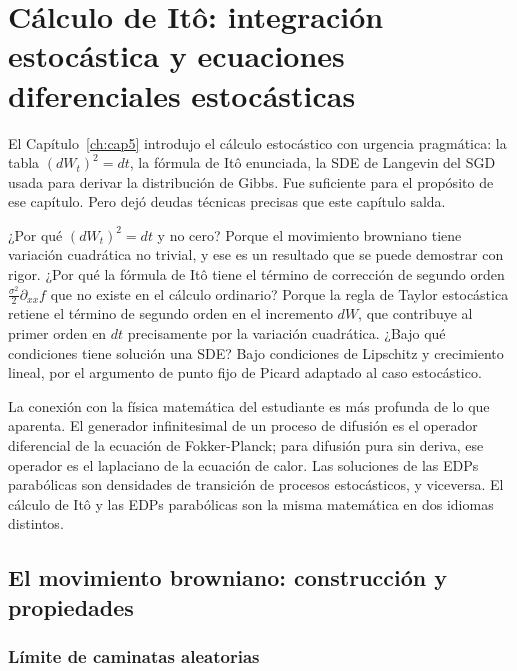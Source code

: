\chapter{Cálculo de Itô: integración estocástica y ecuaciones diferenciales
estocásticas}
\label{ch:cap10}

El Capítulo~\ref{ch:cap5} introdujo el cálculo estocástico con urgencia pragmática: la
tabla $(dW_t)^2 = dt$, la fórmula de Itô enunciada, la SDE de Langevin del
SGD usada para derivar la distribución de Gibbs. Fue suficiente para el
propósito de ese capítulo. Pero dejó deudas técnicas precisas que este capítulo
salda.

¿Por qué $(dW_t)^2 = dt$ y no cero? Porque el movimiento browniano tiene
variación cuadrática no trivial, y ese es un resultado que se puede demostrar
con rigor. ¿Por qué la fórmula de Itô tiene el término de corrección de segundo
orden $\frac{\sigma^2}{2}\partial_{xx}f$ que no existe en el cálculo ordinario?
Porque la regla de Taylor estocástica retiene el término de segundo orden en el
incremento $dW$, que contribuye al primer orden en $dt$ precisamente por la
variación cuadrática. ¿Bajo qué condiciones tiene solución una SDE? Bajo
condiciones de Lipschitz y crecimiento lineal, por el argumento de punto fijo
de Picard adaptado al caso estocástico.

La conexión con la física matemática del estudiante es más profunda de lo que
aparenta. El generador infinitesimal de un proceso de difusión es el operador
diferencial de la ecuación de Fokker-Planck; para difusión pura sin deriva, ese
operador es el laplaciano de la ecuación de calor. Las soluciones de las EDPs
parabólicas son densidades de transición de procesos estocásticos, y viceversa.
El cálculo de Itô y las EDPs parabólicas son la misma matemática en dos idiomas
distintos.

\section{El movimiento browniano: construcción y propiedades}
\label{sec:browniano}

\subsection{Límite de caminatas aleatorias}
\label{subsec:caminata}

